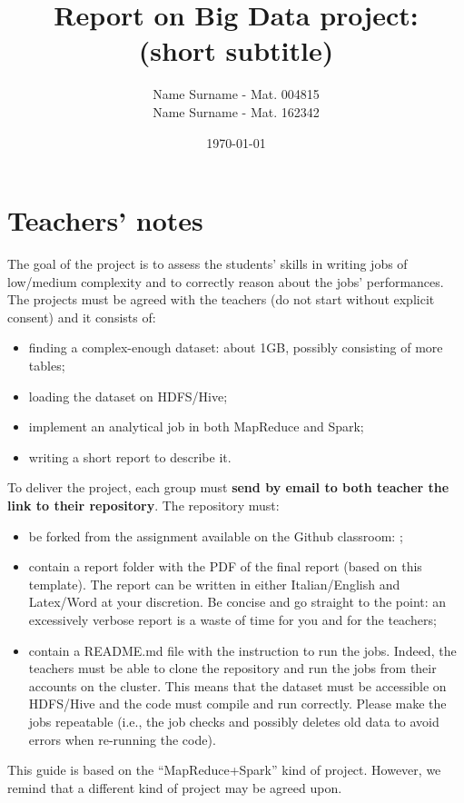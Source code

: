 \documentclass[10pt]{article}
\title{\textbf{Report on Big Data project: \\(short subtitle)}}
\author{
	Name Surname - Mat. 004815\\
	Name Surname - Mat. 162342}
\date{\today}
\begin{document}
\maketitle
\newpage

\tableofcontents

\newpage

\section{Teachers' notes}

The goal of the project is to assess the students' skills in writing jobs of low/medium complexity and to correctly reason about the jobs' performances. The projects must be agreed with the teachers (do not start without explicit consent) and it consists of:

\begin{itemize}
\item finding a complex-enough dataset: about 1GB, possibly consisting of more tables;
\item loading the dataset on HDFS/Hive;
\item implement an analytical job in both MapReduce and Spark;
\item writing a short report to describe it.
\end{itemize}

To deliver the project, each group must {\bf send by email to both teacher the link to their repository}. The repository must:
\begin{itemize}
\item be forked from the assignment available on the Github classroom: \url{};
\item contain a {\sf report} folder with the PDF of the final report (based on this template). The report can be written in either Italian/English and Latex/Word at your discretion. Be concise and go straight to the point: an excessively verbose report is a waste of time for you and for the teachers;
\item contain a {\sf README.md} file with the instruction to run the jobs. Indeed, the teachers must be able to clone the repository and run the jobs from their accounts on the cluster. This means that the dataset must be accessible on HDFS/Hive and the code must compile and run correctly. Please make the jobs repeatable (i.e., the job checks and possibly deletes old data to avoid errors when re-running the code).
\end{itemize}

This guide is based on the ``MapReduce+Spark'' kind of project. However, we remind that a different kind of project may be agreed upon.
\\
\end{document}
